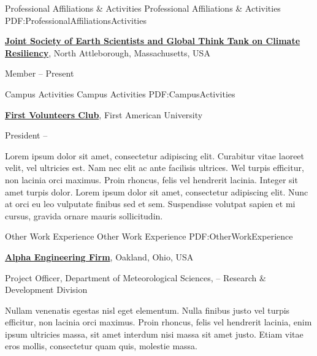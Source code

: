 \documentclass[letterpaper,MMMyyyy,nonstopmode]{simpleresumecv}
\begin{document}
\begin{Body}

  \Section
  {Professional Affiliations\newline
  \& Activities}
  {Professional Affiliations \& Activities}
  {PDF:ProfessionalAffiliationsActivities}

  \Entry
    \href{http://www.example.com/my-society}
    {\textbf{Joint Society of Earth Scientists and Global Think Tank on Climate Resiliency}},
    \newline
    North Attleborough, Massachusetts, USA

  \Gap
    \BulletItem
      Member
      \hfill
       --
      Present


  \newpage
  \Section
  {Campus Activities}
  {Campus Activities}
  {PDF:CampusActivities}

  \Entry
  \href{http://www.example.com/my-club}
  {\textbf{First Volunteers Club}},
  First American University

  \Gap
  \BulletItem
  President
  \hfill
   --
  \begin{Detail}
  \SubBulletItem
  Lorem ipsum dolor sit amet, consectetur adipiscing elit.
  \SubBulletItem
  Curabitur vitae laoreet velit, vel ultricies est. Nam nec elit ac ante facilisis ultrices.
  \SubSubBulletItem
  Wel turpis efficitur, non lacinia orci maximus.
  \SubSubBulletItem
  Proin rhoncus, felis vel hendrerit lacinia.
  \SubBulletItem
  Integer sit amet turpis dolor. Lorem ipsum dolor sit amet, consectetur adipiscing elit. Nunc at orci eu leo vulputate finibus sed et sem.
  \SubBulletItem
  Suspendisse volutpat sapien et mi cursus, gravida ornare mauris sollicitudin.
  \end{Detail}


  \Section
  {Other Work\newline
  Experience}
  {Other Work Experience}
  {PDF:OtherWorkExperience}

  \Entry
    \href{http://www.example.com/my-company}
    {\textbf{Alpha Engineering Firm}},
    Oakland, Ohio, USA

  \Gap
    \BulletItem
      Project Officer,
      Department of Meteorological Sciences,
      \hfill
       --
      \newline
      Research \& Development Division
      \begin{Detail}
        \SubBulletItem
          Nullam venenatis egestas nisl eget elementum.
        \SubBulletItem
          Nulla finibus justo vel turpis efficitur, non lacinia orci maximus. Proin rhoncus, felis vel hendrerit lacinia, enim ipsum ultricies massa, sit amet interdum nisi massa sit amet justo.
        \SubBulletItem
          Etiam vitae eros mollis, consectetur quam quis, molestie massa.
      \end{Detail}


\end{Body}
\end{document}
